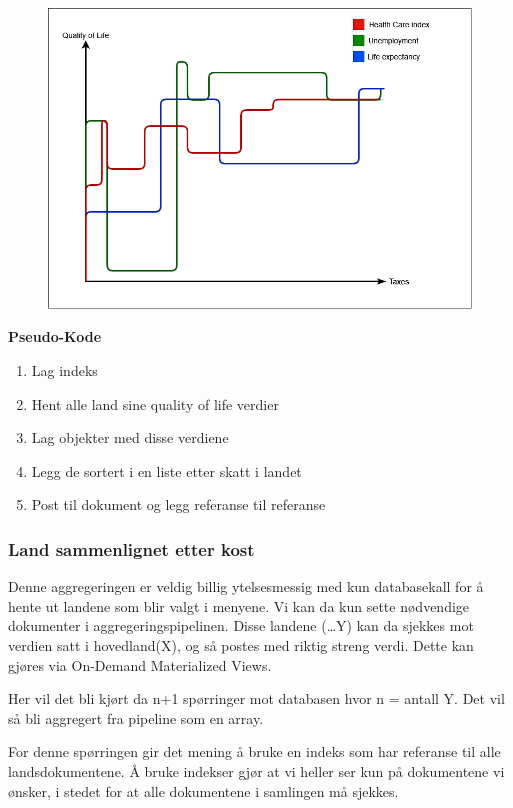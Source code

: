 \FigureCounter
\begin{figure}[H]
  \includegraphics[scale=0.5]{images/milepael3/qualityOfLifeByTaxes.png}
\end{figure}

\textbf{Pseudo-Kode}
\begin{enumerate}
  \item Lag indeks
  \item Hent alle land sine quality of life verdier
  \item Lag objekter med disse verdiene
  \item Legg de sortert i en liste etter skatt i landet
  \item Post til dokument og legg referanse til referanse
\end{enumerate}

\subsubsection{Land sammenlignet etter kost}
Denne aggregeringen er veldig billig ytelsesmessig med kun databasekall for å hente ut landene som blir valgt i menyene. Vi kan da kun sette nødvendige dokumenter i aggregeringspipelinen. Disse landene (…Y) kan da sjekkes mot verdien satt i hovedland(X), og så postes med riktig streng verdi. Dette kan gjøres via On-Demand Materialized Views.

Her vil det bli kjørt da n+1 spørringer mot databasen hvor n = antall Y. Det vil så bli aggregert fra pipeline som en array.

For denne spørringen gir det mening å bruke en indeks som har referanse til alle landsdokumentene. Å bruke indekser gjør at vi heller ser kun på dokumentene vi ønsker, i stedet for at alle dokumentene i samlingen må sjekkes.

